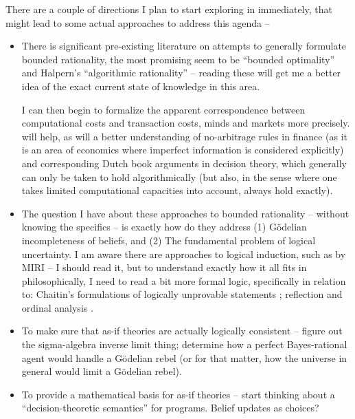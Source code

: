 \documentclass{article}
\begin{document}
There are a couple of directions I plan to start exploring in immediately, that might lead to some actual approaches to address this agenda --

\begin{itemize}

    \item There is significant pre-existing literature on attempts to generally formulate bounded rationality, the most promising seem to be ``bounded optimality'' \cite{Singh2014, Russell1995} and Halpern's ``algorithmic rationality'' \cite{Halpern2013, Halpern2015, Halpern2021} -- reading these will get me a better idea of the exact current state of knowledge in this area.

    I can then begin to formalize the apparent correspondence between computational costs and transaction costs, minds and markets more precisely. \cite{Wuppuluri2020Suwailem} will help, as will a better understanding of no-arbitrage rules in finance \cite{Delbaen2004} (as it is an area of economics where imperfect information is considered explicitly) and corresponding Dutch book arguments in decision theory, which generally can only be taken to hold algorithmically (but also, in the sense where one takes limited computational capacities into account, always hold exactly).
    
    \item The  question I have about these approaches to bounded rationality -- without knowing the specifics -- is exactly how do they address (1) G\"odelian incompleteness of beliefs, and (2) The fundamental problem of logical uncertainty. I am aware there are approaches to logical induction, such as by MIRI \cite{MIRI2016, LW2014} -- I should read it, but to understand exactly how it all fits in philosophically, I need to read a bit more formal logic, specifically in relation to: Chaitin's formulations of logically unprovable statements \cite{Wuppuluri2020}; reflection and ordinal analysis \cite{Rathjen2007}. %

    \item To make sure that as-if theories are actually logically consistent -- figure out the sigma-algebra inverse limit thing; determine how a perfect Bayes-rational agent would handle a G\"odelian rebel (or for that matter, how the universe in general would limit a G\"odelian rebel).

    \item To provide a mathematical basis for as-if theories -- start thinking about a ``decision-theoretic semantics'' for programs. Belief updates as choices?


\end{itemize}

\printbibliography
\end{document}
